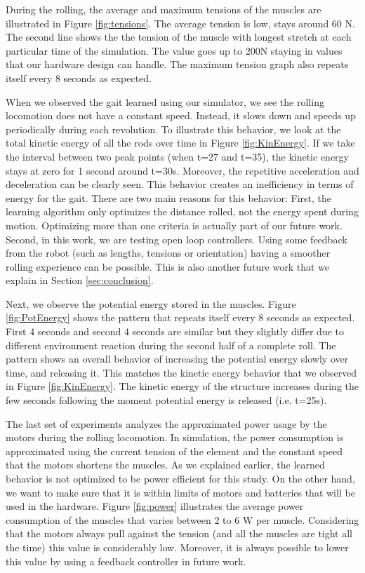 \documentclass[twocolumn,10pt]{asme2ej}
\begin{document}
During the rolling, the average and maximum tensions of the muscles are illustrated in Figure \ref{fig:tensions}. The average tension is low, stays around 60 N. The second line shows the 
the tension of the muscle with longest stretch at each particular time of the simulation. The value goes up to 200N staying in values that our hardware design can handle. The maximum tension graph also repeats itself every 8 seconds as expected.

When we observed  the gait learned using our simulator, we see the rolling locomotion does not have a constant speed. Instead, it slows down and speeds up periodically during each revolution. To illustrate this behavior, we look at the total kinetic energy of all the rods over time in Figure \ref{fig:KinEnergy}. If we take the interval between two peak points (when t=27 and t=35), the kinetic energy stays at zero for 1 second around t=30s. Moreover, the repetitive acceleration and deceleration can be clearly seen. This behavior creates an inefficiency in terms of energy for the gait. There are two main reasons for this behavior: First, the learning algorithm only optimizes the distance rolled, not the energy spent during motion. Optimizing more than one criteria  is actually part of our future work. Second, in this work, we are testing open loop controllers. Using some feedback from the robot (such as lengths, tensions or orientation) having a smoother rolling experience can be possible. This is also another future work that we explain in Section \ref{sec:conclusion}.

Next, we observe the potential energy stored in the muscles. Figure \ref{fig:PotEnergy} shows the pattern that repeats itself every 8 seconds as expected. First 4 seconds and second 4 seconds are similar but they slightly differ due to different environment reaction during the second half of a complete roll. The pattern shows an overall behavior of increasing the potential energy slowly over time, and releasing it. This matches the kinetic energy behavior that we observed in Figure \ref{fig:KinEnergy}. The kinetic energy of the structure increases during the few seconds following the moment potential energy is released (i.e. t=25s).

The last set of experiments analyzes the approximated power usage by the motors during the rolling locomotion. In simulation, the power consumption is approximated using the current tension of the element  and the constant speed that the motors shortens the muscles. As we explained earlier, the learned behavior is not optimized to be power efficient for this study. On the other hand, we want to make sure that it is within limits of motors and batteries that will be used in the hardware. Figure \ref{fig:power} illustrates the average power consumption of the muscles that varies between 2 to 6 W per muscle. Considering that the motors always pull against the tension (and all the muscles are  tight all the time) this value is considerably low. Moreover, it is always possible to lower this value by using a feedback controller in future work.
\end{document}
